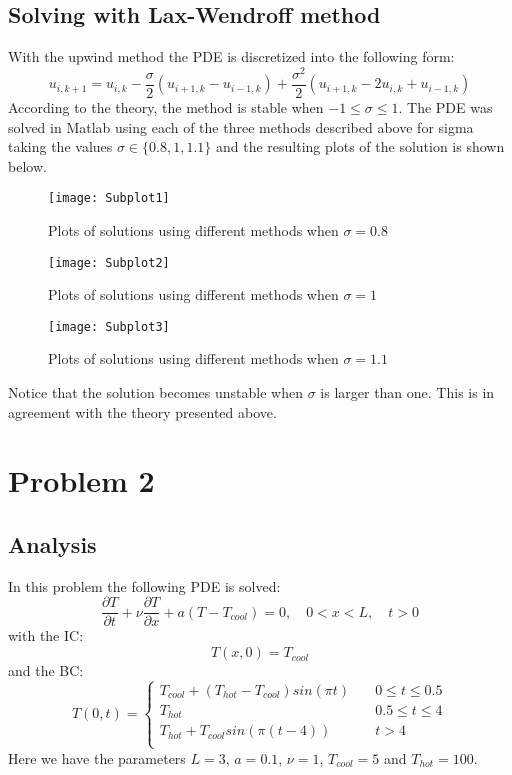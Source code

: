 \documentclass[11pt,a4paper,roman]{scrartcl}
\begin{document}
\subsection*{Solving with Lax-Wendroff method}
With the upwind method the PDE is discretized into the following form:
\begin{equation}
u_{i,k+1} = u_{i,k}-\frac{\sigma}{2}(u_{i+1,k}-u_{i-1,k})+\frac{\sigma^2}{2}(u_{i+1,k}-2u_{i,k}+u_{i-1,k})
\end{equation}
According to the theory, the method is stable when $-1\leq \sigma \leq 1$.
\newpage
The PDE was solved in Matlab using each of the three methods described above for sigma taking the values $\sigma\in\{0.8,1,1.1\}$ and the resulting plots of the solution is shown below.


\begin{figure}[h]
\centering
\texttt{[image: Subplot1]}
\caption{Plots of solutions using different methods when $\sigma=0.8$}
\end{figure}

\begin{figure}[h]
\centering
\texttt{[image: Subplot2]}
\caption{Plots of solutions using different methods when $\sigma=1$}
\end{figure}

\begin{figure}[h]
\centering
\texttt{[image: Subplot3]}
\caption{Plots of solutions using different methods when $\sigma=1.1$}
\end{figure}

Notice that the solution becomes unstable when $\sigma$ is larger than one. This is in agreement with the theory presented above.

\section*{Problem 2}
\subsection*{Analysis}
In this problem the following PDE is solved:
\begin{equation}
\frac{\partial T}{\partial t} + \nu\frac{\partial T}{\partial x}+a(T-T_{cool}) = 0, \quad 0<x<L, \quad t>0
\end{equation}
with the IC: 
\begin{equation}
T(x,0)=T_{cool}
\end{equation}
and the BC:
\begin{equation}
T(0,t) = 
\begin{cases}
T_{cool} + (T_{hot}-T_{cool})sin(\pi t) \quad & 0\leq t \leq 0.5 \\
T_{hot}	\quad & 0.5 \leq t \leq 4 \\
T_{hot} + T_{cool} sin(\pi(t-4)) \quad & t>4\\
\end{cases}
\end{equation}
Here we have the parameters $L=3$, $a=0.1$, $\nu=1$, $T_{cool}=5$ and $T_{hot} = 100$.
\end{document}
